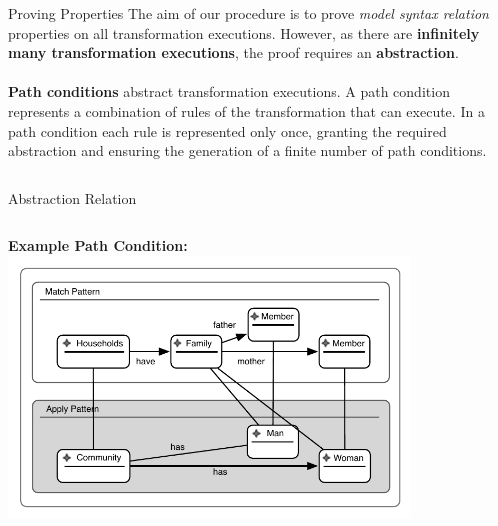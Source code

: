 \documentclass[final,hyperref={pdfpagelabels=false}]{beamer}
\begin{document}
\begin{frame}{}
\begin{columns}[t]
        \begin{column}{.26\linewidth}

         \begin{block}{Proving Properties}
         \vspace{1.5cm}
        \small{
        The aim of our procedure is to prove \emph{model syntax relation}
        properties on all transformation executions. However, as there are
        \textbf{infinitely many transformation executions}, the proof requires
        an \textbf{abstraction}.\\~\\
		\vspace{.5cm}
        \textbf{Path conditions} abstract transformation executions. A path condition represents a combination of rules of the transformation that can execute. In a path condition each rule is represented only once, granting the required abstraction and ensuring the generation of a finite number of path conditions.} 
        \vspace{1.55cm}
        \end{block}
        \end{column}
       \end{columns}
      
      

      \begin{columns}[t]
        \begin{column}{.993\linewidth}      
			\begin{block}{Abstraction Relation}
                \begin{columns}[t]
                \begin{column}{.24\linewidth}
                \begin{center}
              
                
                \textbf{Example Path Condition:}\\
              \includegraphics[width=0.8\textwidth]{../figures/presentation/artifacts/path_condition}\\
            

\end{center}
\end{column}
\end{columns}
\end{block}
\end{column}
\end{columns}
\end{frame}
\end{document}
